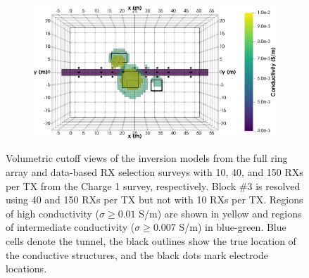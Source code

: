 \documentclass[preprint,authoryear,12pt]{elsarticle}
\begin{document}
\begin{figure}[htp]{}
\begin{center}
\begin{subfigure}{0.55\linewidth}
      \end{subfigure}
      \hspace{-4.0cm}
      \qquad
      \begin{subfigure}{0.55\linewidth}
         \label{fig:MultiBlk_StraightTunnel_RxSelection_10mBlk_DataDiff10Perc_150RxPerTx_Top_2ISO}
         \includegraphics[trim=0cm 0cm 0cm 0cm, clip=true,width=\linewidth]{./figures/Fig24h.png}
      \end{subfigure}
      \vspace{0.2cm}
   \end{center}
\vspace{-0.4cm}
\caption{Volumetric cutoff views of the inversion models from the full ring array and data-based RX selection surveys with 10, 40, and 150 RXs per TX from the Charge 1 survey, respectively. Block \#3 is resolved using 40 and 150 RXs per TX but not with 10 RXs per TX. Regions of high conductivity ($\sigma \geq 0.01$ S/m) are shown in yellow and regions of intermediate conductivity ($\sigma \geq 0.007$ S/m) in blue-green. Blue cells denote the tunnel, the black outlines show the true location of the conductive structures, and the black dots mark electrode locations.}
\label{fig:InvMod_SurveyDesign_MultiBlk_Isosurfaces_Charge1_RxSelection}
\end{figure}
\end{document}
